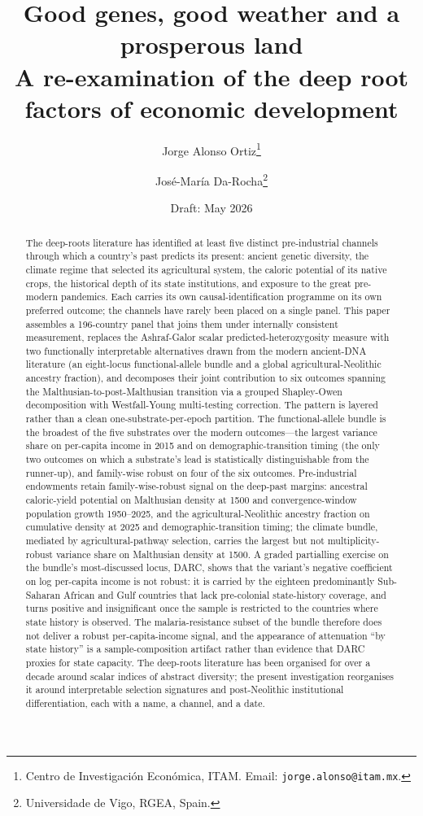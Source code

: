 \documentclass[11pt,letterpaper]{article}
\title{Good genes, good weather and a prosperous land\\
{\large A re-examination of the deep root factors of economic development}}
\author{Jorge Alonso Ortiz\thanks{Centro de Investigaci\'on Econ\'omica, ITAM. Email: \texttt{jorge.alonso@itam.mx}.}
  \and Jos\'e-Mar\'ia Da-Rocha\thanks{Universidade de Vigo, RGEA, Spain.}}
\date{Draft: May 2026}
\begin{document}
\maketitle

\begin{abstract}
\noindent
The deep-roots literature has identified at least five distinct pre-industrial channels through which a country's past predicts its present: ancient genetic diversity, the climate regime that selected its agricultural system, the caloric potential of its native crops, the historical depth of its state institutions, and exposure to the great pre-modern pandemics. Each carries its own causal-identification programme on its own preferred outcome; the channels have rarely been placed on a single panel. This paper assembles a 196-country panel that joins them under internally consistent measurement, replaces the Ashraf-Galor scalar predicted-heterozygosity measure with two functionally interpretable alternatives drawn from the modern ancient-DNA literature (an eight-locus functional-allele bundle and a global agricultural-Neolithic ancestry fraction), and decomposes their joint contribution to six outcomes spanning the Malthusian-to-post-Malthusian transition via a grouped Shapley-Owen decomposition with Westfall-Young multi-testing correction. The pattern is layered rather than a clean one-substrate-per-epoch partition. The functional-allele bundle is the broadest of the five substrates over the modern outcomes---the largest variance share on per-capita income in 2015 and on demographic-transition timing (the only two outcomes on which a substrate's lead is statistically distinguishable from the runner-up), and family-wise robust on four of the six outcomes. Pre-industrial endowments retain family-wise-robust signal on the deep-past margins: ancestral caloric-yield potential on Malthusian density at 1500 and convergence-window population growth 1950--2025, and the agricultural-Neolithic ancestry fraction on cumulative density at 2025 and demographic-transition timing; the climate bundle, mediated by agricultural-pathway selection, carries the largest but not multiplicity-robust variance share on Malthusian density at 1500. A graded partialling exercise on the bundle's most-discussed locus, DARC, shows that the variant's negative coefficient on log per-capita income is not robust: it is carried by the eighteen predominantly Sub-Saharan African and Gulf countries that lack pre-colonial state-history coverage, and turns positive and insignificant once the sample is restricted to the countries where state history is observed. The malaria-resistance subset of the bundle therefore does not deliver a robust per-capita-income signal, and the appearance of attenuation ``by state history'' is a sample-composition artifact rather than evidence that DARC proxies for state capacity. The deep-roots literature has been organised for over a decade around scalar indices of abstract diversity; the present investigation reorganises it around interpretable selection signatures and post-Neolithic institutional differentiation, each with a name, a channel, and a date.


\end{abstract}
\end{document}
